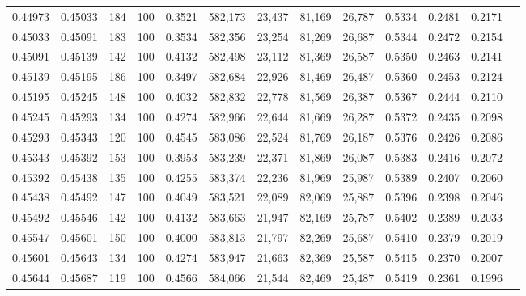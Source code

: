 \begin{tabular}{rrrrrrrrrrrrr}
0.44973 & 0.45033 &   184 & 100 &                                     0.3521 & 582,173 &  23,437 &  81,169 &  26,787 & 0.5334 & 0.2481 & 0.2171 \\
0.45033 & 0.45091 &   183 & 100 &                                     0.3534 & 582,356 &  23,254 &  81,269 &  26,687 & 0.5344 & 0.2472 & 0.2154 \\
0.45091 & 0.45139 &   142 & 100 &                                     0.4132 & 582,498 &  23,112 &  81,369 &  26,587 & 0.5350 & 0.2463 & 0.2141 \\
0.45139 & 0.45195 &   186 & 100 &                                     0.3497 & 582,684 &  22,926 &  81,469 &  26,487 & 0.5360 & 0.2453 & 0.2124 \\
0.45195 & 0.45245 &   148 & 100 &                                     0.4032 & 582,832 &  22,778 &  81,569 &  26,387 & 0.5367 & 0.2444 & 0.2110 \\
0.45245 & 0.45293 &   134 & 100 &                                     0.4274 & 582,966 &  22,644 &  81,669 &  26,287 & 0.5372 & 0.2435 & 0.2098 \\
0.45293 & 0.45343 &   120 & 100 &                                     0.4545 & 583,086 &  22,524 &  81,769 &  26,187 & 0.5376 & 0.2426 & 0.2086 \\
0.45343 & 0.45392 &   153 & 100 &                                     0.3953 & 583,239 &  22,371 &  81,869 &  26,087 & 0.5383 & 0.2416 & 0.2072 \\
0.45392 & 0.45438 &   135 & 100 &                                     0.4255 & 583,374 &  22,236 &  81,969 &  25,987 & 0.5389 & 0.2407 & 0.2060 \\
0.45438 & 0.45492 &   147 & 100 &                                     0.4049 & 583,521 &  22,089 &  82,069 &  25,887 & 0.5396 & 0.2398 & 0.2046 \\
0.45492 & 0.45546 &   142 & 100 &                                     0.4132 & 583,663 &  21,947 &  82,169 &  25,787 & 0.5402 & 0.2389 & 0.2033 \\
0.45547 & 0.45601 &   150 & 100 &                                     0.4000 & 583,813 &  21,797 &  82,269 &  25,687 & 0.5410 & 0.2379 & 0.2019 \\
0.45601 & 0.45643 &   134 & 100 &                                     0.4274 & 583,947 &  21,663 &  82,369 &  25,587 & 0.5415 & 0.2370 & 0.2007 \\
0.45644 & 0.45687 &   119 & 100 &                                     0.4566 & 584,066 &  21,544 &  82,469 &  25,487 & 0.5419 & 0.2361 & 0.1996 \\

\end{tabular}
